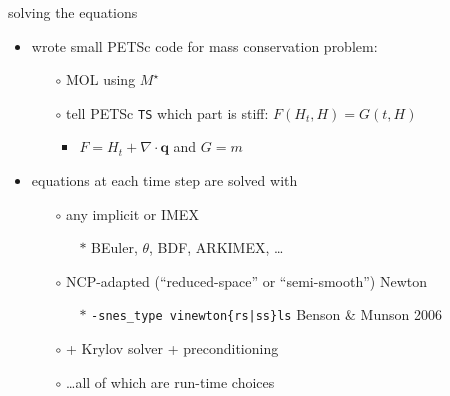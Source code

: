 \documentclass[hide notes,intlimits,usenames,dvipsnames]{beamer}
\newcommand{\Div}{\nabla\cdot}
\begin{document}
\begin{frame}{solving the equations}
\medskip
\begin{itemize}
\item wrote small PETSc code for mass conservation problem:
    \begin{itemize}
    \item[$\circ$] MOL using $M^\star$
    \item[$\circ$] tell PETSc \texttt{TS} which part is stiff: $F(H_t,H) = G(t,H)$
        \begin{itemize}
        \item  $F=H_t + \Div \mathbf{q}$ and $G=m$
        \end{itemize}
    \end{itemize}
\item equations at each time step are solved with
    \begin{itemize}
    \item[$\circ$] any implicit or IMEX
        \begin{itemize}
        \item[$\ast$] BEuler, $\theta$, BDF, ARKIMEX, \dots
        \end{itemize}
    \item[$\circ$] NCP-adapted (``reduced-space'' or ``semi-smooth'') Newton
        \begin{itemize}
        \item[$\ast$] \texttt{-snes\_type vinewton\{rs|ss\}ls} \hfill \tiny Benson \& Munson 2006 \normalsize
        \end{itemize}
    \item[$\circ$] + Krylov solver + preconditioning
    \item[$\circ$] \dots all of which are run-time choices
    \end{itemize}
\end{itemize}
\end{frame}
\end{document}
